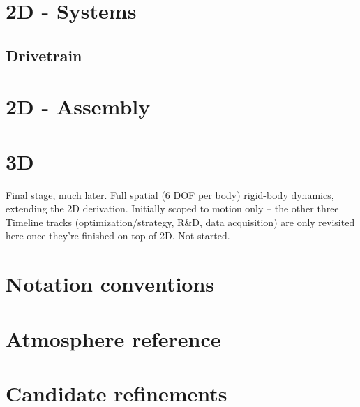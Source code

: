 \documentclass[10pt]{extarticle}
\numberwithin{equation}{subsection}
\newenvironment{aiblock}{\color{blue}}{}
\begin{document}
\newpage
\section{2D - Systems}
\label{sec:2dsystems}


\newpage
 \newpage
 \newpage
\subsection{Drivetrain}

\newpage
\section{2D - Assembly}



\newpage
\section{3D}
\label{sec:3d}
\begin{aiblock}
Final stage, much later. Full spatial (6 DOF per body) rigid-body dynamics, extending the 2D derivation. Initially scoped to motion only -- the other three Timeline tracks (optimization/strategy, R\&D, data acquisition) are only revisited here once they're finished on top of 2D. Not started.
\end{aiblock}

\newpage
\appendix
\section{Notation conventions}
\label{app:notation}


\section{Atmosphere reference}
\label{app:atmosphere}


\section{Candidate refinements}
\label{app:refinements}

\end{document}

